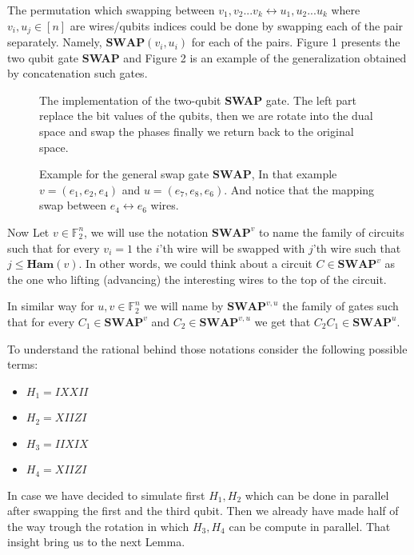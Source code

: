 \documentclass{article}
\begin{document}
\begin{multicols*}{2}
The permutation which swapping between \({ v_1 , v_2 ... v_k } \leftrightarrow { u_1 , u_2 ... u_k }\) where \(v_i,u_j \in [n]\) are wires/qubits indices could be done by swapping each of the pair separately. Namely, \(\textbf{SWAP}(v_{i},u_{i})\) for each of the pairs. Figure 1 presents the two qubit gate \textbf{SWAP} and Figure 2 is an example of the generalization obtained by concatenation such gates. 


\begin{figure}[H]
  \centering
    
    \caption{The implementation of the two-qubit \textbf{SWAP} gate. The left part replace the bit values of the qubits, then we are rotate into the dual space and swap the phases finally we return back to the original space.}
    \label{fig:average-data-vs-model}
\end{figure}

\begin{figure}[H]
  \centering
    
    \caption{Example for the general swap gate  \( \textbf{SWAP}\), In that example \(v = \left(e_1, e_2, e_4\right) \) and \(u = \left(e_7, e_8, e_6\right)\). And notice that the mapping swap between \( e_4 \leftrightarrow e_6\) wires.  }
    \label{fig:average-data-vs-model}
\end{figure}


Now Let \(v \in \mathbb{F}_{2}^{n}\), we will use the notation \( \textbf{SWAP}^{v} \) to name the family of circuits such that for every \(v_i =1\) the \(i\)'th wire will be swapped with \(j\)'th wire such that \(j \le \textbf{Ham}(v)\). In other words, we could think about a circuit \(C \in \textbf{SWAP}^{v}\) as the one who lifting (advancing) the interesting wires to the top of the circuit.  

In similar way for \(u,v \in \mathbb{F}_{2}^{n}\) we will name by \( \textbf{SWAP}^{v,u} \) the family of gates such that for every \( C_{1} \in \textbf{SWAP}^{v}\) and \( C_{2} \in \textbf{SWAP}^{v,u} \) we get that \(C_{2}C_{1} \in \textbf{SWAP}^{u}\).

To understand the rational behind those notations consider the following  possible terms:
\begin{itemize}
    \item \(H_{1} = I  X  X  I  I \)
    \item \(H_{2} = X  I  I  Z  I \)
    \item \(H_{3} = I  I  X  I  X \)
    \item \(H_{4} = X  I  I  Z  I \)
\end{itemize} In case we have decided to simulate first \(H_{1},H_{2}\) which can be done in parallel after swapping the first and the third qubit. Then we already have made half of the way trough the rotation in which \(H_{3},H_{4}\) can be compute in parallel. That insight bring us to the next Lemma.     

\end{multicols*}
\end{document}
